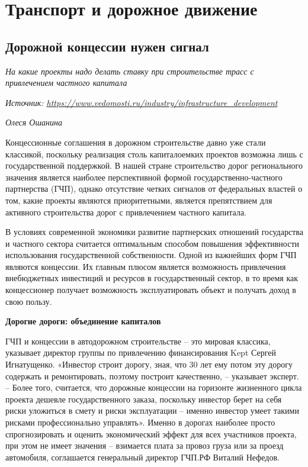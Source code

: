 \chapter{Транспорт и дорожное движение}

\section{Дорожной концессии нужен сигнал}

\textit{На какие проекты надо делать ставку при строительстве трасс с привлечением частного капитала}

\textit{Источник: \url{https://www.vedomosti.ru/industry/infrastructure_development}}

\textit{Олеся Ошанина}

Концессионные соглашения в дорожном строительстве давно уже стали классикой, поскольку реализация столь капиталоемких проектов возможна лишь с государственной поддержкой. В нашей стране строительство дорог регионального значения является наиболее перспективной формой государственно-частного партнерства (ГЧП), однако отсутствие четких сигналов от федеральных властей о том, какие проекты являются приоритетными, является препятствием для активного строительства дорог с привлечением частного капитала.

В условиях современной экономики развитие партнерских отношений государства и частного сектора считается оптимальным способом повышения эффективности использования государственной собственности. Одной из важнейших форм ГЧП являются концессии. Их главным плюсом является возможность привлечения внебюджетных инвестиций и ресурсов в государственный сектор, в то время как концессионер получает возможность эксплуатировать объект и получать доход в свою пользу.

\textbf{Дорогие дороги: объединение капиталов}

ГЧП и концессии в автодорожном строительстве – это мировая классика, указывает директор группы по привлечению финансирования Kept Сергей Игнатущенко. «Инвестор строит дорогу, зная, что 30 лет ему потом эту дорогу содержать и ремонтировать, поэтому построит качественно, – указывает эксперт. – Более того, считается, что дорожные концессии на горизонте жизненного цикла проекта дешевле государственного заказа, поскольку инвестор берет на себя риски уложиться в смету и риски эксплуатации – именно инвестор умеет такими рисками профессионально управлять». Именно в дорогах наиболее просто спрогнозировать и оценить экономический эффект для всех участников проекта, при этом не имеет значения – взимается плата за провоз груза или за проезд автомобиля, соглашается генеральный директор ГЧП.РФ Виталий Нефедов.


